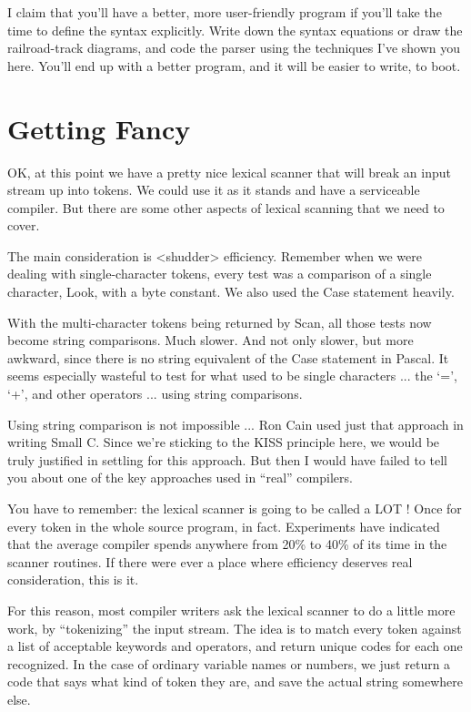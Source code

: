 I claim that you'll have  a better, more user-friendly program if you'll take the time to define the syntax explicitly. Write down the syntax equations or  draw  the  railroad-track  diagrams, and code the parser using the techniques I've shown you here. You'll end  up with a better program, and it will be easier to write, to boot.

\section{Getting Fancy}

OK, at this point we have a pretty nice lexical scanner that will break  an  input stream up into tokens. We could use  it  as  it stands and have a serviceable compiler. But there are  some other aspects of lexical scanning that we need to cover.

The main consideration is <shudder> efficiency. Remember when we were dealing  with  single-character  tokens, every  test  was a comparison of a single character, Look, with a byte constant. We also used the Case statement heavily.

With the multi-character tokens being returned by Scan, all those tests now become string comparisons. Much slower. And  not only slower, but more awkward, since  there is no string equivalent of the  Case  statement  in Pascal. It seems especially wasteful to test for what used to be single characters ... the `=', `+', and other operators ... using string comparisons.

Using string comparison is not  impossible ... Ron Cain used just that approach in writing Small C. Since we're  sticking  to  the KISS principle here, we would  be truly justified in settling for this  approach. But then I would have failed to tell you about one of the key approaches used in ``real'' compilers.

You have to remember: the lexical scanner is going to be called a  LOT !   Once for every token in the  whole  source  program, in fact. Experiments  have  indicated  that  the  average compiler spends  anywhere  from 20\% to 40\% of  its  time  in  the  scanner routines. If there were ever a place  where  efficiency deserves real consideration, this is it.

For this reason, most compiler writers ask the lexical scanner to do  a  little  more work, by ``tokenizing''  the input stream. The idea  is  to  match every token  against  a  list  of  acceptable keywords  and operators, and return unique  codes  for  each  one recognized. In the case of ordinary variable  names  or numbers, we  just return a code that says what kind of token they are, and save the actual string somewhere else.

